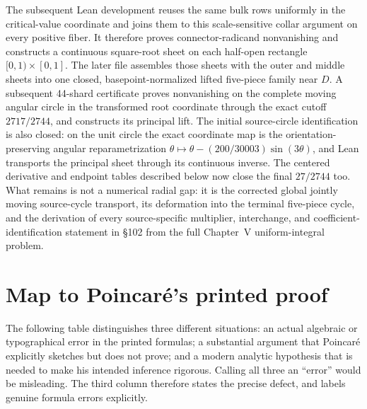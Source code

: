 \documentclass[11pt]{article}
\begin{document}
The subsequent Lean development reuses the same bulk rows uniformly in the critical-value
coordinate and joins them to this scale-sensitive collar argument on every positive fiber.  It
therefore proves connector-radicand nonvanishing and constructs a continuous square-root sheet
on each half-open rectangle $[0,1)\times[0,1]$.  The later file
 assembles those sheets with the outer and middle sheets
into one closed, basepoint-normalized lifted five-piece family near $D$.  A subsequent 44-shard
certificate proves nonvanishing on the complete moving angular circle in the transformed root
coordinate through the exact cutoff $2717/2744$, and constructs its principal lift.  The initial
source-circle identification is also closed: on the unit
circle the exact coordinate map is the orientation-preserving angular reparametrization
$\theta\mapsto\theta-(200/30003)\sin(3\theta)$, and Lean transports the principal sheet through
its continuous inverse.  The centered derivative and endpoint tables described below now close
the final $27/2744$ too.  What remains is not a numerical radial gap: it is the corrected global
jointly moving source-cycle transport, its deformation into the terminal five-piece cycle, and
the derivation of every source-specific multiplier, interchange, and coefficient-identification
statement in \S102 from the full Chapter~V uniform-integral problem.

\section{Map to Poincar\'e's printed proof}\label{sec:source-map}

The following table distinguishes three different situations: an actual algebraic or typographical
error in the printed formulas; a substantial argument that Poincar\'e explicitly sketches but does
not prove; and a modern analytic hypothesis that is needed to make his intended inference rigorous.
Calling all three an ``error'' would be misleading.  The third column therefore states the precise
defect, and labels genuine formula errors explicitly.
\end{document}
